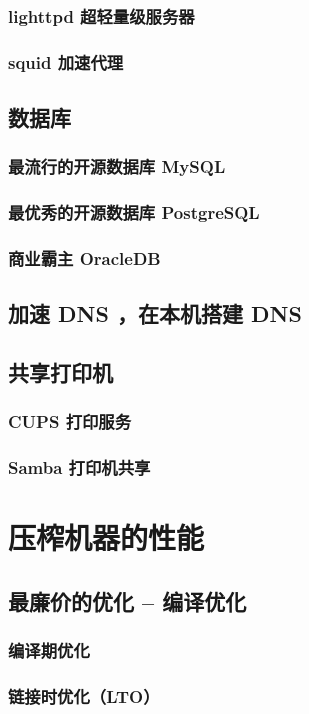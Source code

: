 \documentclass[amstex]{ctexbook}
\begin{document}
\subsection{ lighttpd 超轻量级服务器}
\subsection{ squid 加速代理	}
\section{  数据库	}
\subsection{  最流行的开源数据库 MySQL}
\subsection{  最优秀的开源数据库 PostgreSQL 	}
\subsection{  商业霸主 OracleDB	}
\section{  加速 DNS ，在本机搭建 DNS	}
\section{  共享打印机	}
\subsection{ CUPS 打印服务	}
\subsection{ Samba 打印机共享	}


\chapter{压榨机器的性能}
\section{  最廉价的优化 – 编译优化	}
\subsection{  编译期优化	}
\subsection{  链接时优化（LTO）	}
\end{document}
